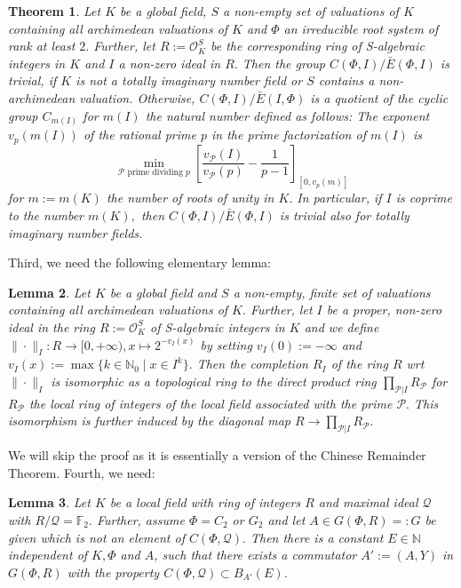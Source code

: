 \documentclass[12pt]{amsart}
\newcommand{\C}[1]{{\mathcal #1}}
\newtheorem{theorem}{Theorem}[section]
\newtheorem{lemma}[theorem]{Lemma}
\theoremstyle{definition}\newtheorem{definition}[theorem]{Definition}
\theoremstyle{remark}\newtheorem{remark}[theorem]{Remark}
\theoremstyle{definition}\newtheorem{case}{Case}
\begin{document}
\begin{theorem}\cite[Corollary~4.3,Theorem~12.4]{MR244257}\cite[Corollaire~4.6]{MR0240214}\label{BMS_thm}
Let $K$ be a global field, $S$ a non-empty set of valuations of $K$ containing all archimedean valuations of $K$ and $\Phi$ an irreducible root system of rank at least $2.$ Further, let $R:=\mathscr{O}_K^S$ be the corresponding ring of S-algebraic integers in $K$ and $I$ a non-zero ideal in $R.$ Then the group $C(\Phi,I)/\bar{E}(\Phi,I)$ is trivial, if $K$ is not a totally imaginary number field or $S$ contains a non-archimedean valuation. Otherwise, $C(\Phi,I)/\bar{E}(I,\Phi)$ is a quotient of the cyclic group $C_{m(I)}$ for $m(I)$ the natural number defined as follows: The exponent $v_p(m(I))$ of the rational prime $p$ in the prime factorization of $m(I)$ is 
\[
\min_{\C P\text{ prime dividing }p}\left[\frac{v_{\C P}(I)}{v_{\C P}(p)}-\frac{1}{p-1}\right]_{[0,v_p(m)]}
\]
for $m:=m(K)$ the number of roots of unity in $K.$ In particular, if $I$ is coprime to the number $m(K),$ then $C(\Phi,I)/\bar{E}(\Phi,I)$ is trivial also for totally imaginary number fields.
\end{theorem}

Third, we need the following elementary lemma:

\begin{lemma}\label{adic_chin_remainder}
Let $K$ be a global field and $S$ a non-empty, finite set of valuations containing all archimedean valuations of $K.$ Further, let $I$ be a proper, non-zero ideal in the ring $R:=\mathscr{O}_K^S$ of S-algebraic integers in $K$ and we define $\|\cdot\|_I:R\to[0,+\infty),x\mapsto 2^{-v_I(x)}$ by setting $v_I(0):=-\infty$ and $v_I(x):=\max\{k\in\mathbb{N}_0\mid x\in I^k\}.$ Then the completion $R_I$ of the ring $R$ wrt $\|\cdot\|_I$ is isomorphic as a topological ring to the direct product ring $\prod_{\C P|I} R_{\C P}$ for $R_{\C P}$ the local ring of integers of the local field associated with the prime $\C P.$ This isomorphism is further induced by the diagonal map $R\to \prod_{\C P|I} R_{\C P}.$
\end{lemma}

We will skip the proof as it is essentially a version of the Chinese Remainder Theorem. Fourth, we need:

\begin{lemma}\label{F_2_congruence_lemma}
Let $K$ be a local field with ring of integers $R$ and maximal ideal $\C Q$ with $R/\C Q=\mathbb{F}_2.$ Further, assume $\Phi=C_2$ or $G_2$ and let $A\in G(\Phi,R)=:G$ be given which is not an element of $C(\Phi,\C Q).$ Then there is a constant $E\in\mathbb{N}$ independent of $K,\Phi$ and $A$, such that there exists a commutator $A':=(A,Y)$ in $G(\Phi,R)$ with the property $C(\Phi,\C Q)\subset B_{A'}(E)$.
\end{lemma}
\end{document}
